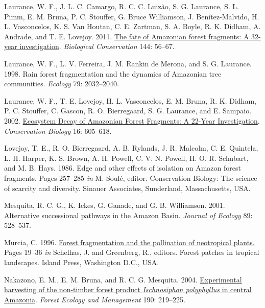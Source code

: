 \documentclass[
  12pt,
  man, donotrepeattitle,floatsintext]{apa6}
\newlength{\cslhangindent}
\newlength{\cslentryspacingunit} %
\newenvironment{CSLReferences}[2] %
 {%
  \setlength{\parindent}{0pt}
  \ifodd #1
  \let\oldpar\par
  \def\par{\hangindent=\cslhangindent\oldpar}
  \fi
  \setlength{\parskip}{#2\cslentryspacingunit}
 }%
 {}
\begin{document}
\begin{CSLReferences}{1}{0}
\leavevmode{}%
Laurance, W. F., J. L. C. Camargo, R. C. C. Luizão, S. G. Laurance, S. L. Pimm, E. M. Bruna, P. C. Stouffer, G. Bruce Williamson, J. Benítez-Malvido, H. L. Vasconcelos, K. S. Van Houtan, C. E. Zartman, S. A. Boyle, R. K. Didham, A. Andrade, and T. E. Lovejoy. 2011. \href{https://doi.org/10.1016/j.biocon.2010.09.021}{The fate of {Amazonian} forest fragments: {A} 32-year investigation}. \emph{Biological Conservation} 144: 56--67.

\leavevmode{}%
Laurance, W. F., L. V. Ferreira, J. M. Rankin de Merona, and S. G. Laurance. 1998. Rain forest fragmentation and the dynamics of {Amazonian} tree communities. \emph{Ecology} 79: 2032--2040.

\leavevmode{}%
Laurance, W. F., T. E. Lovejoy, H. L. Vasconcelos, E. M. Bruna, R. K. Didham, P. C. Stouffer, C. Gascon, R. O. Bierregaard, S. G. Laurance, and E. Sampaio. 2002. \href{https://doi.org/10.1046/j.1523-1739.2002.01025.x}{Ecosystem {Decay} of {Amazonian} {Forest} {Fragments}: A 22-{Year} {Investigation}}. \emph{Conservation Biology} 16: 605--618.

\leavevmode{}%
Lovejoy, T. E., R. O. Bierregaard, A. B. Rylands, J. R. Malcolm, C. E. Quintela, L. H. Harper, K. S. Brown, A. H. Powell, C. V. N. Powell, H. O. R. Schubart, and M. B. Hays. 1986. Edge and other effects of isolation on {Amazon} forest fragments. Pages 257--285 \emph{in} M. Soulé, editor. Conservation {Biology}: The science of scarcity and diversity. Sinauer Associates, Sunderland, Massachusetts, USA.

\leavevmode{}%
Mesquita, R. C. G., K. Ickes, G. Ganade, and G. B. Williamson. 2001. Alternative successional pathways in the {Amazon} {Basin}. \emph{Journal of Ecology} 89: 528--537.

\leavevmode{}%
Murcia, C. 1996. \href{https://www.cabdirect.org/cabdirect/abstract/19970611608}{Forest fragmentation and the pollination of neotropical plants.} Pages 19--36 \emph{in} Schelhas, J. and Greenberg, R., editors. Forest patches in tropical landscapes. Island Press, Washington D.C., USA.

\leavevmode{}%
Nakazono, E. M., E. M. Bruna, and R. C. G. Mesquita. 2004. \href{https://doi.org/10.1016/j.foreco.2003.10.013}{Experimental harvesting of the non-timber forest product \emph{{Ischnosiphon} polyphyllus} in central {Amazonia}}. \emph{Forest Ecology and Management} 190: 219--225.


\end{CSLReferences}
\end{document}
